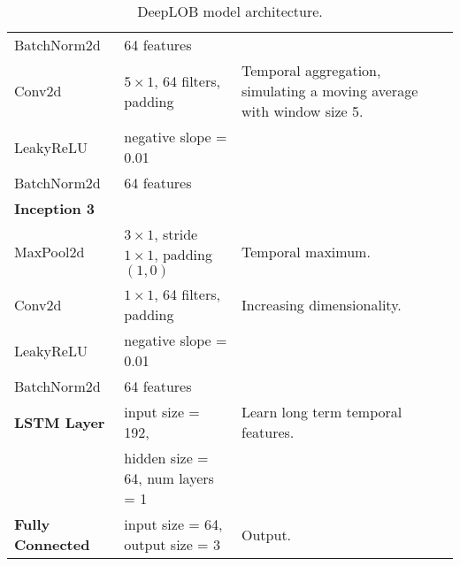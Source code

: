 \begin{table}[ht]
{\begin{tabular}{|l|l|l|}
                \quad BatchNorm2d & 64 features & \\
                \quad Conv2d & $5 \times 1$, 64 filters, padding  & Temporal aggregation, simulating a moving average with window size 5.\\
                \quad LeakyReLU & negative slope = 0.01 & \\
                \quad BatchNorm2d & 64 features & \\
                \hline
                \textbf{Inception 3} & & \\
                \quad MaxPool2d & $3 \times 1$, stride $1 \times 1$, padding $(1, 0)$ & Temporal maximum.\\
                \quad Conv2d & $1 \times 1$, 64 filters, padding  & Increasing dimensionality.\\
                \quad LeakyReLU & negative slope = 0.01 & \\
                \quad BatchNorm2d & 64 features & \\
                \hline
                \textbf{LSTM Layer} & input size = 192, & Learn long term temporal features.\\
                                    & hidden size = 64, num layers = 1 & \\
                \hline
                \textbf{Fully Connected} & input size = 64, output size = 3 & Output.\\
                \hline
            \end{tabular}
    }
        \caption{DeepLOB model architecture.}
\end{table}

